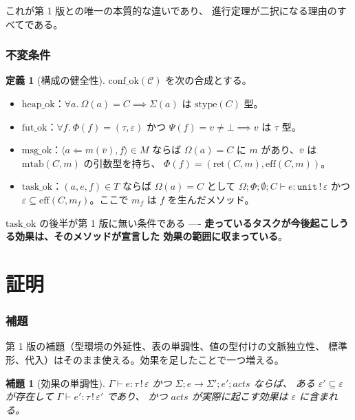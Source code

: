 \documentclass[11pt,a4paper]{ltjsarticle}
\newtheorem{lemma}[theorem]{補題}
\theoremstyle{definition}
\newtheorem{definition}[theorem]{定義}
\theoremstyle{remark}
\newcommand{\tunit}{\ensuremath{\mathtt{unit}}}
\newcommand{\Om}{\Omega}
\newcommand{\Sm}{\Sigma}
\newcommand{\Ph}{\Phi}
\newcommand{\Ps}{\Psi}
\newcommand{\mtab}{\mathrm{mtab}}
\newcommand{\stype}{\mathrm{stype}}
\newcommand{\mret}{\mathrm{ret}}
\newcommand{\meff}{\mathrm{eff}}
\newcommand{\heapok}{\mathrm{heap\_ok}}
\newcommand{\msgok}{\mathrm{msg\_ok}}
\newcommand{\taskok}{\mathrm{task\_ok}}
\newcommand{\confok}{\mathrm{conf\_ok}}
\newcommand{\futok}{\mathrm{fut\_ok}}
\begin{document}
これが第 1 版との唯一の本質的な違いであり、
進行定理が二択になる理由のすべてである。

\section{不変条件}

\begin{definition}[構成の健全性]
$\confok(\mathcal{C})$ を次の合成とする。
\begin{itemize}
\item $\heapok$：$\forall a.\ \Om(a) = C \implies \Sm(a)$ は $\stype(C)$ 型。
\item $\futok$：$\forall f.\ \Ph(f) = (\tau,\varepsilon)$ かつ
  $\Ps(f) = v \neq \bot \implies v$ は $\tau$ 型。
\item $\msgok$：$\langle a \Leftarrow m(\bar v), f\rangle \in M$ ならば
  $\Om(a) = C$ に $m$ があり、$\bar v$ は $\mtab(C,m)$ の引数型を持ち、
  $\Ph(f) = (\mret(C,m), \meff(C,m))$。
\item $\taskok$：$(a,e,f) \in T$ ならば $\Om(a) = C$ として
  $\Om;\Ph;\emptyset;C \vdash e : \tunit \,!\, \varepsilon$ かつ
  $\varepsilon \subseteq \meff(C,m_f)$。ここで $m_f$ は $f$ を生んだメソッド。
\end{itemize}
\end{definition}

$\taskok$ の後半が第 1 版に無い条件である ----
\textbf{走っているタスクが今後起こしうる効果は、そのメソッドが宣言した
効果の範囲に収まっている}。

\part{証明}
\label{part:proof}

\section{補題}

第 1 版の補題（型環境の外延性、表の単調性、値の型付けの文脈独立性、
標準形、代入）はそのまま使える。効果を足したことで一つ増える。

\begin{lemma}[効果の単調性]
\label{lem:effmono}
$\Gamma \vdash e : \tau \,!\, \varepsilon$ かつ
$\Sm; e \to \Sm'; e'; \mathit{acts}$ ならば、
ある $\varepsilon' \subseteq \varepsilon$ が存在して
$\Gamma \vdash e' : \tau \,!\, \varepsilon'$ であり、
かつ $\mathit{acts}$ が実際に起こす効果は $\varepsilon$ に含まれる。
\end{lemma}
\end{document}
